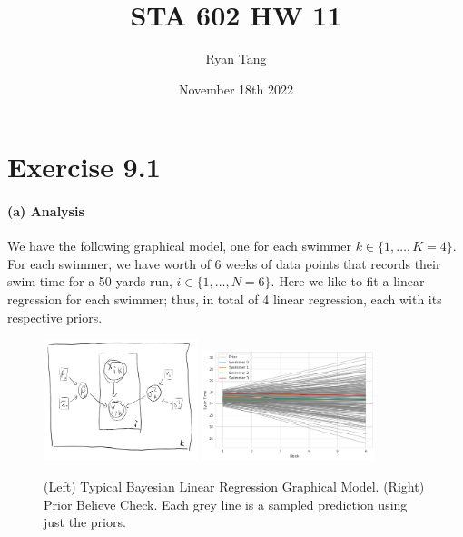 \documentclass[11pt, letterpaper]{article}
\author{Ryan Tang}
\title{STA 602 HW 11}
\date{November 18th 2022}
\begin{document}
\maketitle

\section{Exercise 9.1}
\paragraph{(a) Analysis}
We have the following graphical model, one for each swimmer $k \in \{1, \dots, K=4\}$. For each swimmer, we have worth of 6 weeks of data points that records their swim time for a 50 yards run, $i \in \{1, \dots, N=6\}$. Here we like to fit a linear regression for each swimmer; thus, in total of 4 linear regression, each with its respective priors.
\begin{figure}[!h]
  \centering
  \includegraphics[width=0.4\textwidth]{1.2.graph.png}
  \includegraphics[width=0.45\textwidth]{1.1.png}
  \caption{(Left) Typical Bayesian Linear Regression Graphical Model. (Right) Prior Believe Check. Each grey line is a sampled prediction using just the priors.}
  \label{fig:ex9.1_model}
\end{figure}
\end{document}

